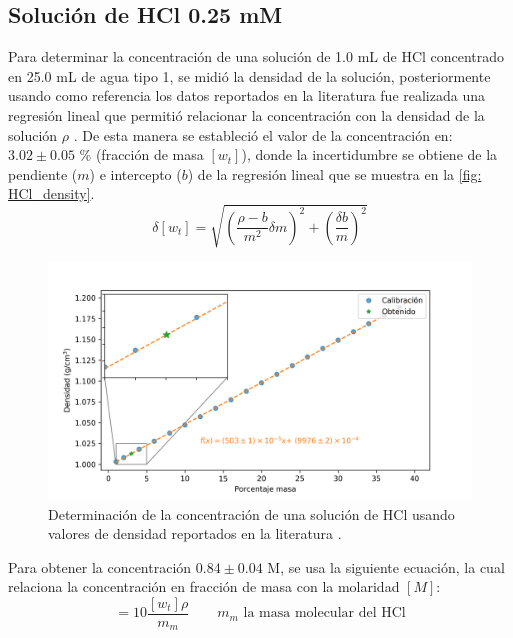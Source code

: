 	\subsection{Soluci\'on de HCl 0.25 mM}
		Para determinar la concentraci\'on de una soluci\'on de 1.0 mL de HCl concentrado en 25.0 mL de agua tipo 1, se midi\'o la densidad de la soluci\'on, posteriormente usando como referencia los datos reportados en la literatura fue realizada una regresi\'on lineal que permiti\'o relacionar la concentraci\'on con la densidad de la soluci\'on $\rho$ \cite{perry2007perry}. De esta manera se estableci\'o el valor de la concentraci\'on en: $3.02 \pm 0.05$ \% (fracci\'on de masa $[w_t]$), donde la incertidumbre se obtiene de la pendiente ($m$) e intercepto ($b$) de la regresi\'on lineal que se muestra en la \autoref{fig: HCl_density}.
		\begin{equation}
			\delta [w_t] = \sqrt{\left(\dfrac{\rho-b}{m^2}\delta m\right)^2 + \left(\dfrac{\delta b}{m}\right)^2}
		\end{equation}
		\begin{figure}[h]
			\centering
			\includegraphics[width=\linewidth]{../Data/Concentration/C_HCl_initial.png}
			\caption{Determinaci\'on de la concentraci\'on de una soluci\'on de HCl usando valores de densidad reportados en la literatura \cite{perry2007perry}.}
			\label{fig: HCl_density}
		\end{figure}
		
		Para obtener la concentraci\'on $0.84 \pm 0.04$ M, se usa la siguiente ecuaci\'on, la cual relaciona la concentraci\'on en fracci\'on de masa con la molaridad $[M]$:
		\begin{equation}
			[M] = 10\dfrac{[w_t]\rho}{m_m} \qquad \text{$m_m$ la masa molecular del HCl}
		\end{equation}
		
